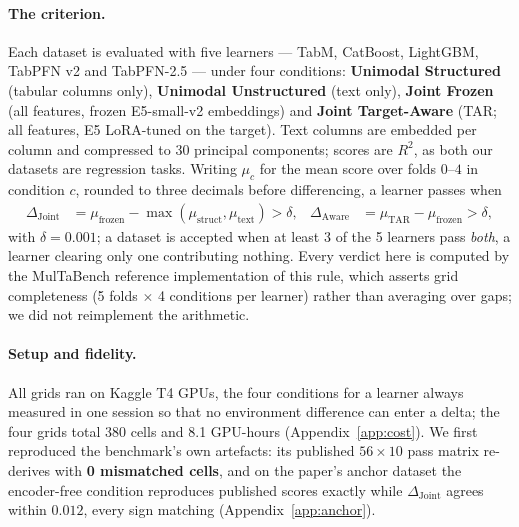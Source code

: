 \documentclass[10pt,letterpaper]{article}
\newcommand{\dj}{\Delta_{\mathrm{Joint}}}
\newcommand{\da}{\Delta_{\mathrm{Aware}}}
\begin{document}
\paragraph{The criterion.} Each dataset is evaluated with five learners --- TabM, CatBoost,
LightGBM, TabPFN v2 and TabPFN-2.5 --- under four conditions: \textbf{Unimodal Structured}
(tabular columns only), \textbf{Unimodal Unstructured} (text only), \textbf{Joint Frozen} (all
features, frozen E5-small-v2 embeddings) and \textbf{Joint Target-Aware} (TAR; all features,
E5 LoRA-tuned on the target). Text columns are embedded per column and compressed to 30
principal components; scores are $R^2$, as both our datasets are regression tasks. Writing
$\mu_c$ for the mean score over folds $0$--$4$ in condition $c$, rounded to three decimals
before differencing, a learner passes when
\begin{align}
\dj &= \mu_{\text{frozen}} - \max(\mu_{\text{struct}}, \mu_{\text{text}}) > \delta,
&\da &= \mu_{\text{TAR}} - \mu_{\text{frozen}} > \delta,
\end{align}
with $\delta = 0.001$; a dataset is accepted when at least 3 of the 5 learners pass
\emph{both}, a learner clearing only one contributing nothing. Every verdict here is computed
by the MulTaBench reference implementation of this rule, which asserts grid completeness
(5 folds $\times$ 4 conditions per learner) rather than averaging over gaps; we did not
reimplement the arithmetic.

\paragraph{Setup and fidelity.} All grids ran on Kaggle T4 GPUs, the four conditions for a
learner always measured in one session so that no environment difference can enter a delta;
the four grids total 380 cells and 8.1 GPU-hours (Appendix~\ref{app:cost}). We first
reproduced the benchmark's own artefacts: its published $56 \times 10$ pass matrix re-derives
with \textbf{0 mismatched cells}, and on the paper's anchor dataset the encoder-free condition
reproduces published scores exactly while $\dj$ agrees within $0.012$, every sign matching
(Appendix~\ref{app:anchor}).
\end{document}
